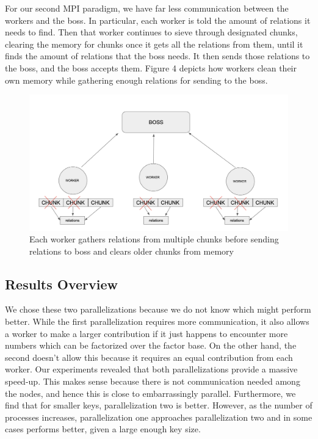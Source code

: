 \documentclass[11pt,twocolumn]{article}
\begin{document}
For our second MPI paradigm, we have far less communication between the workers and the boss. In particular, each worker is told the amount of relations it needs to find. Then that worker continues to sieve through designated chunks, clearing the memory for chunks once it gets all the relations from them, until it finds the amount of relations that the boss needs. It then sends those relations to the boss, and the boss accepts them. Figure 4 depicts how workers clean their own memory while gathering enough relations for sending to the boss.

\begin{figure}[!htb]
    \centering
   \includegraphics[scale = 0.2]{MPI-Para2.png}
    \caption{Each worker gathers relations from multiple chunks before sending relations to boss and clears older chunks from memory}
    \label{MPI-V2}
\end{figure}

\subsection{Results Overview}
We chose these two parallelizations because we do not know which might perform better. While the first parallelization requires more communication, it also allows a worker to make a larger contribution if it just happens to encounter more numbers which can be factorized over the factor base. On the other hand, the second doesn't allow this because it requires an equal contribution from each worker. Our experiments revealed that both parallelizations provide a massive speed-up. This makes sense because there is not communication needed among the nodes, and hence this is close to embarrassingly parallel. Furthermore, we find that for smaller keys, parallelization two is better. However, as the number of processes increases, parallelization one approaches parallelization two and in some cases performs better, given a large enough key size.
\end{document}
